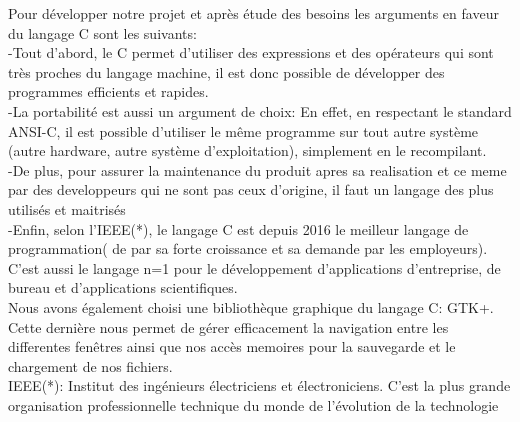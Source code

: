 \documentclass[a4]{article}
\begin{document}
Pour développer notre projet et après étude des besoins les arguments en faveur du langage C sont les suivants:\\

-Tout d'abord, le C permet d'utiliser des expressions et des opérateurs qui sont très proches du langage machine, 
il est donc possible de développer des programmes efficients et rapides.\\

-La portabilité est aussi un argument de choix: En effet, en respectant le standard ANSI-C, il est possible d'utiliser
le même programme sur tout autre système (autre hardware, autre système d'exploitation), simplement en le recompilant.\\

-De plus, pour assurer la maintenance du produit apres sa realisation et ce meme par des developpeurs qui ne sont
pas ceux d'origine, il faut un langage des plus utilisés et maitrisés\\

-Enfin, selon l'IEEE(*), le langage C est depuis 2016 le meilleur langage de 
programmation( de par sa forte croissance et sa demande par les employeurs). C'est aussi le langage n=1 pour le développement
d’applications d’entreprise, de bureau et d'applications scientifiques.\\

Nous avons également choisi une bibliothèque graphique du langage C: GTK+. Cette dernière nous permet de gérer efficacement
la navigation entre les differentes fenêtres
ainsi que nos accès memoires pour la sauvegarde et le chargement de nos fichiers. \\
IEEE(*):  Institut des ingénieurs électriciens et électroniciens.
C'est la plus grande organisation professionnelle technique du monde de l'évolution de la technologie
\end{document}
